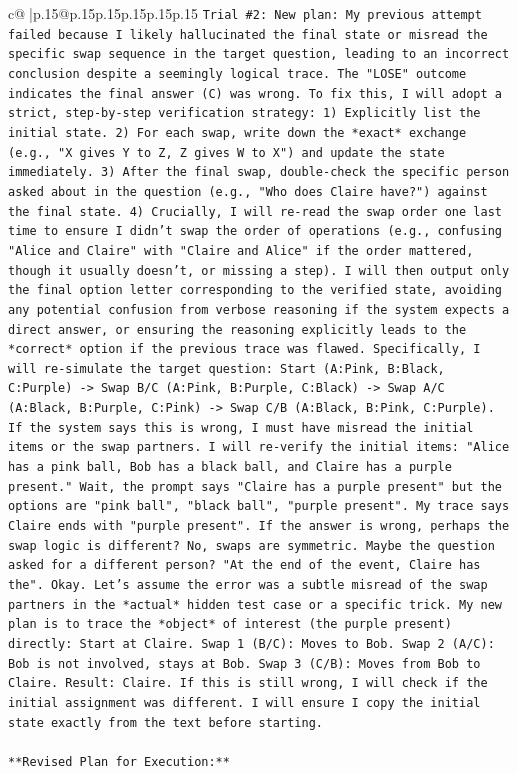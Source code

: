 \documentclass{article}
\begin{document}
{\begin{supertabular}{c@{$\;$}|p{.15\linewidth}@{}p{.15\linewidth}p{.15\linewidth}p{.15\linewidth}p{.15\linewidth}p{.15\linewidth}}
{{{\texttt{Trial \#2: New plan: My previous attempt failed because I likely hallucinated the final state or misread the specific swap sequence in the target question, leading to an incorrect conclusion despite a seemingly logical trace. The "LOSE" outcome indicates the final answer (C) was wrong. To fix this, I will adopt a strict, step{-}by{-}step verification strategy: 1) Explicitly list the initial state. 2) For each swap, write down the *exact* exchange (e.g., "X gives Y to Z, Z gives W to X") and update the state immediately. 3) After the final swap, double{-}check the specific person asked about in the question (e.g., "Who does Claire have?") against the final state. 4) Crucially, I will re{-}read the swap order one last time to ensure I didn't swap the order of operations (e.g., confusing "Alice and Claire" with "Claire and Alice" if the order mattered, though it usually doesn't, or missing a step). I will then output only the final option letter corresponding to the verified state, avoiding any potential confusion from verbose reasoning if the system expects a direct answer, or ensuring the reasoning explicitly leads to the *correct* option if the previous trace was flawed. Specifically, I will re{-}simulate the target question: Start (A:Pink, B:Black, C:Purple) {-}> Swap B/C (A:Pink, B:Purple, C:Black) {-}> Swap A/C (A:Black, B:Purple, C:Pink) {-}> Swap C/B (A:Black, B:Pink, C:Purple). If the system says this is wrong, I must have misread the initial items or the swap partners. I will re{-}verify the initial items: "Alice has a pink ball, Bob has a black ball, and Claire has a purple present." Wait, the prompt says "Claire has a purple present" but the options are "pink ball", "black ball", "purple present". My trace says Claire ends with "purple present". If the answer is wrong, perhaps the swap logic is different? No, swaps are symmetric. Maybe the question asked for a different person? "At the end of the event, Claire has the". Okay. Let's assume the error was a subtle misread of the swap partners in the *actual* hidden test case or a specific trick. My new plan is to trace the *object* of interest (the purple present) directly: Start at Claire. Swap 1 (B/C): Moves to Bob. Swap 2 (A/C): Bob is not involved, stays at Bob. Swap 3 (C/B): Moves from Bob to Claire. Result: Claire. If this is still wrong, I will check if the initial assignment was different. I will ensure I copy the initial state exactly from the text before starting.} \\
\\ 
\texttt{**Revised Plan for Execution:**} \\
}}}
\end{supertabular}}
\end{document}
